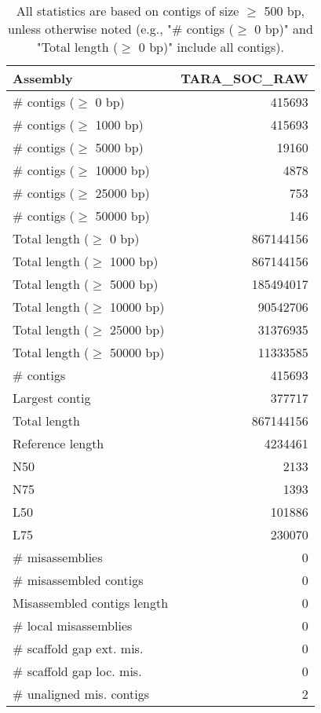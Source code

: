 \documentclass[12pt,a4paper]{article}
\begin{document}
\begin{table}[ht]
\begin{center}
\caption{All statistics are based on contigs of size $\geq$ 500 bp, unless otherwise noted (e.g., "\# contigs ($\geq$ 0 bp)" and "Total length ($\geq$ 0 bp)" include all contigs).}
\begin{tabular}{|l*{1}{|r}|}
\hline
Assembly & TARA\_SOC\_RAW \\ \hline
\# contigs ($\geq$ 0 bp) & 415693 \\ \hline
\# contigs ($\geq$ 1000 bp) & 415693 \\ \hline
\# contigs ($\geq$ 5000 bp) & 19160 \\ \hline
\# contigs ($\geq$ 10000 bp) & 4878 \\ \hline
\# contigs ($\geq$ 25000 bp) & 753 \\ \hline
\# contigs ($\geq$ 50000 bp) & 146 \\ \hline
Total length ($\geq$ 0 bp) & 867144156 \\ \hline
Total length ($\geq$ 1000 bp) & 867144156 \\ \hline
Total length ($\geq$ 5000 bp) & 185494017 \\ \hline
Total length ($\geq$ 10000 bp) & 90542706 \\ \hline
Total length ($\geq$ 25000 bp) & 31376935 \\ \hline
Total length ($\geq$ 50000 bp) & 11333585 \\ \hline
\# contigs & 415693 \\ \hline
Largest contig & 377717 \\ \hline
Total length & 867144156 \\ \hline
Reference length & 4234461 \\ \hline
N50 & 2133 \\ \hline
N75 & 1393 \\ \hline
L50 & 101886 \\ \hline
L75 & 230070 \\ \hline
\# misassemblies & 0 \\ \hline
\# misassembled contigs & 0 \\ \hline
Misassembled contigs length & 0 \\ \hline
\# local misassemblies & 0 \\ \hline
\# scaffold gap ext. mis. & 0 \\ \hline
\# scaffold gap loc. mis. & 0 \\ \hline
\# unaligned mis. contigs & 2 \\ \hline

\end{tabular}
\end{center}
\end{table}
\end{document}
